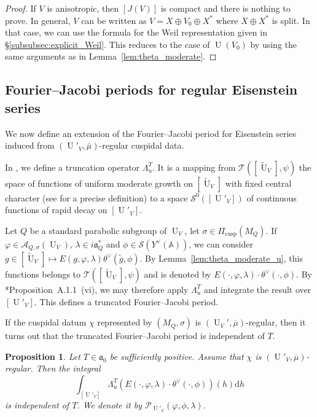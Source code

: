 \documentclass[letterpaper,11pt]{amsart}
\newcommand{\fa}{\mathfrak{a}}
\newcommand{\bA}{\mathbb{A}}
\newcommand{\cA}{\mathcal{A}}
\newcommand{\cP}{\mathcal{P}}
\newcommand{\cS}{\mathcal{S}}
\newcommand{\cT}{\mathcal{T}}
\newcommand{\rd}{\mathrm{d}}
\newcommand{\<}{\negthickspace}
\DeclareMathOperator{\U}{U}
\DeclareMathOperator{\cusp}{cusp}
\theoremstyle{definition}
\theoremstyle{plain}
\newtheorem{prop}[definition]{Proposition}
\theoremstyle{remark}
\numberwithin{equation}{section}
\begin{document}
\begin{proof}
    If $V$ is anisotropic, then $[J(V)]$ is compact and there is nothing to prove. In general, $V$ can be written as $V=X \oplus V_0 \oplus X^*$ where $X \oplus X^*$ is split. In that case, we can use the formula for the Weil representation given in \S\ref{subsubsec:explicit_Weil}. This reduces to the case of $\U(V_0)$ by using the same arguments as in Lemma~\ref{lem:theta_moderate}.
\end{proof}

\subsection{Fourier--Jacobi periods for regular Eisenstein series}
\label{subsec:reg_FJ}


We now define an extension of the Fourier--Jacobi period for Eisenstein series induced from $(\U'_V,\overline{\mu})$-regular cuspidal data.


In \cite[Section~7.5]{BLX1}, we define a truncation operator $\Lambda_u^T$. It is a mapping from $\cT([\widetilde{\U}_V],\psi)$ the space of functions of uniform moderate growth on $[\widetilde{\U}_V]$ with fixed central character (see \cite[Section~3.3.5]{BLX1} for a precise definition) to a space $\cS^0([\U'_V])$ of continuous functions of rapid decay on $[\U'_V]$. 

Let $Q$ be a standard parabolic subgroup of $\U_V$, let $\sigma \in \Pi_{\cusp}(M_Q)$. If $\varphi \in \cA_{Q,\sigma}(\U_V)$, $\lambda \in i \fa_{Q}^*$ and $\phi \in \cS(Y^\vee(\bA))$, we can consider $ g \in [\widetilde{\U}_V] \mapsto E(g,\varphi,\lambda) \theta^\vee(\widetilde{g},\phi)$. By Lemma~\ref{lem:theta_moderate_u}, this functions belongs to $\cT([\widetilde{\U}_V],\psi)$ and is denoted by $E(\cdot,\varphi,\lambda) \cdot \theta^\vee(\cdot,\phi)$. By \cite{BP}*{Proposition~A.1.1~(vi)}, we may therefore apply $\Lambda_u^T$ and integrate the result over $[\U'_V]$. This defines a truncated Fourier--Jacobi period.

If the cuspidal datum $\chi$ represented by $(M_Q,\sigma)$ is $(\U_V',\overline{\mu})$-regular, then it turns out that the truncated Fourier--Jacobi period is independent of $T$.

\begin{prop}   \label{prop:IY_stability}
Let $T \in \fa_0$ be sufficiently positive. Assume that $\chi$ is $(\U'_V,\overline{\mu})$-regular. Then the integral
\begin{equation} \label{eq:regularized_Fourier_Jacobi}
    \int_{[\U'_V]}  \Lambda_u^T \left( E(\cdot,\varphi,\lambda)
    \cdot \theta^\vee(\cdot,\phi) \right)(h) \rd h
    \end{equation}
    is independent of $T$. We denote it by $\cP_{\U'_V}(\varphi,\phi,\lambda)$. 
\end{prop}
\end{document}
